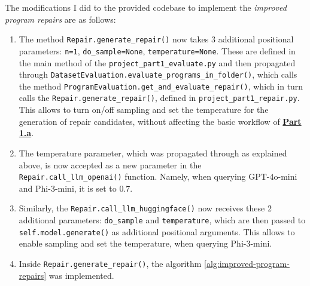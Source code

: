 \documentclass{article}
\begin{document}
The modifications I did to the provided codebase to implement the \textit{improved program repairs} are as follows:

\begin{enumerate}
    \item The method \texttt{Repair.generate\_repair()} now takes 3 additional positional parameters: \texttt{n=1}, \texttt{do\_sample=None}, \texttt{temperature=None}. These are defined in the main method of the \texttt{project\_part1\_evaluate.py} and then propagated through \texttt{DatasetEvaluation.evaluate\_programs\_in\_folder()}, which calls the method \texttt{ProgramEvaluation.get\_and\_evaluate\_repair()}, which in turn calls the \texttt{Repair.generate\_repair()}, defined in \texttt{project\_part1\_repair.py}. This allows to turn on/off sampling and set the temperature for the generation of repair candidates, without affecting the basic workflow of \hyperref[part-a]{\textbf{Part 1.a}}.
    \item The temperature parameter, which was propagated through as explained above, is now accepted as a new parameter in the \texttt{Repair.call\_llm\_openai()} function. Namely, when querying GPT-4o-mini and Phi-3-mini, it is set to $0.7$. 
    \item Similarly, the \texttt{Repair.call\_llm\_huggingface()} now receives these 2 additional parameters: \texttt{do\_sample} and \texttt{temperature}, which are then passed to \texttt{self.model.generate()} as additional positional arguments. This allows to enable sampling and set the temperature, when querying Phi-3-mini.
    \item Inside \texttt{Repair.generate\_repair()}, the algorithm \ref{alg:improved-program-repairs} was implemented. 
\end{enumerate}
\end{document}
